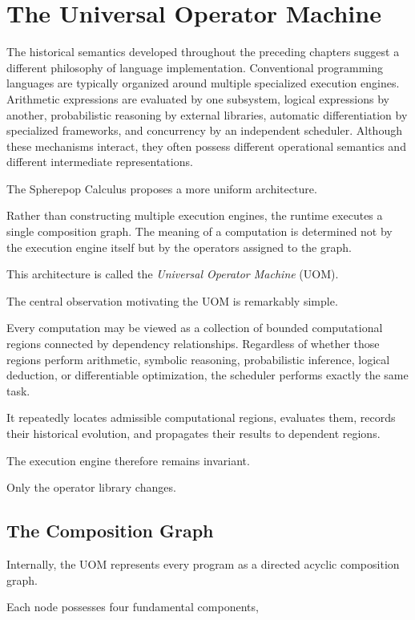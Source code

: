 \documentclass[12pt,oneside]{article}
\theoremstyle{definition}
\theoremstyle{remark}
\begin{document}
\section{The Universal Operator Machine}

The historical semantics developed throughout the preceding chapters suggest a
different philosophy of language implementation. Conventional programming
languages are typically organized around multiple specialized execution
engines. Arithmetic expressions are evaluated by one subsystem, logical
expressions by another, probabilistic reasoning by external libraries,
automatic differentiation by specialized frameworks, and concurrency by an
independent scheduler. Although these mechanisms interact, they often possess
different operational semantics and different intermediate representations.

The Spherepop Calculus proposes a more uniform architecture.

Rather than constructing multiple execution engines, the runtime executes a
single composition graph. The meaning of a computation is determined not by
the execution engine itself but by the operators assigned to the graph.

This architecture is called the \emph{Universal Operator Machine} (UOM).

The central observation motivating the UOM is remarkably simple.

Every computation may be viewed as a collection of bounded computational
regions connected by dependency relationships. Regardless of whether those
regions perform arithmetic, symbolic reasoning, probabilistic inference,
logical deduction, or differentiable optimization, the scheduler performs
exactly the same task.

It repeatedly locates admissible computational regions, evaluates them,
records their historical evolution, and propagates their results to dependent
regions.

The execution engine therefore remains invariant.

Only the operator library changes.

\subsection{The Composition Graph}

Internally, the UOM represents every program as a directed acyclic composition
graph.

Each node possesses four fundamental components,
\end{document}
